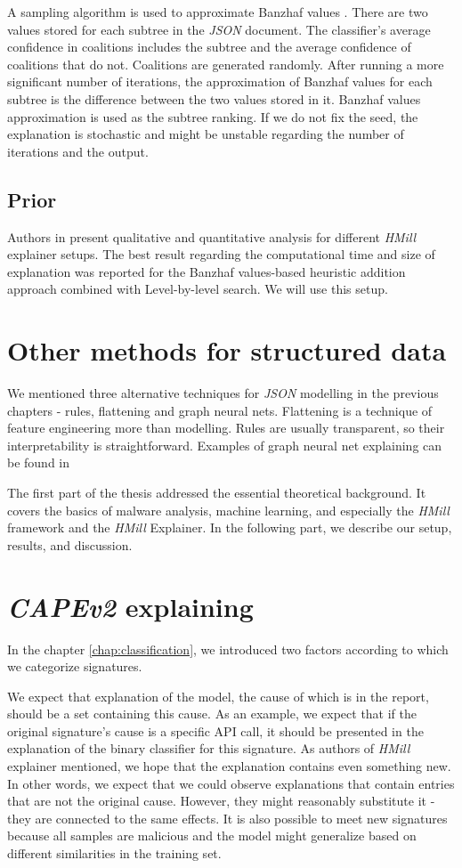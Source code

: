 A sampling algorithm is used to approximate Banzhaf values \cite{Bachrach2010}. There are two values stored for each subtree in the \emph{JSON} document. The classifier's average confidence in coalitions includes the subtree and the average confidence of coalitions that do not. Coalitions are generated randomly. After running a more significant number of iterations, the approximation of Banzhaf values for each subtree is the difference between the two values stored in it. Banzhaf values approximation is used as the subtree ranking. If we do not fix the seed, the explanation is stochastic and might be unstable regarding the number of iterations and the output.

\subsection{Prior}
Authors in \cite{Pevny2020} present qualitative and quantitative analysis for different \emph{HMill} explainer setups. The best result regarding the computational time and size of explanation was reported for the Banzhaf values-based heuristic addition approach combined with Level-by-level search. We will use this setup.

\section{Other methods for structured data}
We mentioned three alternative techniques for \emph{JSON} modelling in the previous chapters - rules, flattening and graph neural nets. Flattening is a technique of feature engineering more than modelling. Rules are usually transparent, so their interpretability is straightforward. Examples of graph neural net explaining can be found in \cite{Ying2019, Huang2020} 

The first part of the thesis addressed the essential theoretical background. It covers the basics of malware analysis, machine learning, and especially the \emph{HMill} framework and the \emph{HMill} Explainer. In the following part, we describe our setup, results, and discussion.

\section{\emph{CAPEv2} explaining}
In the chapter \ref{chap:classification}, we introduced two factors according to which we categorize signatures.

We expect that explanation of the model, the cause of which is in the report, should be a set containing this cause. As an example, we expect that if the original signature's cause is a specific API call, it should be presented in the explanation of the binary classifier for this signature. As authors of \emph{HMill} explainer mentioned, we hope that the explanation contains even something new. In other words, we expect that we could observe explanations that contain entries that are not the original cause. However, they might reasonably substitute it - they are connected to the same effects. It is also possible to meet new signatures because all samples are malicious and the model might generalize based on different similarities in the training set.

